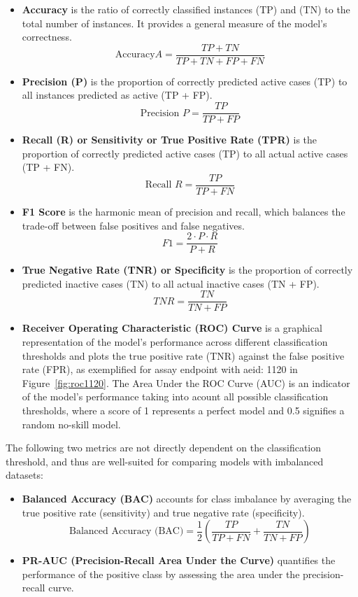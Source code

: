 \begin{itemize}
  \item \textbf{Accuracy} is the ratio of correctly classified instances (TP) and (TN) to the total number of instances. It provides a general measure of the model's correctness.
  \[ \text{Accuracy}  A = \frac{TP + TN}{TP + TN + FP + FN} \]

  \item \textbf{Precision (P)} is the proportion of correctly predicted active cases (TP) to all instances predicted as active (TP + FP). 
  \[ \text{Precision } P = \frac{TP}{TP + FP} \]

  \item \textbf{Recall (R) or Sensitivity or True Positive Rate (TPR)} is the proportion of correctly predicted active cases (TP) to all actual active cases (TP + FN).
  \[ \text{Recall } R = \frac{TP}{TP + FN} \]

  \item \textbf{F1 Score} is the harmonic mean of precision and recall, which balances the trade-off between false positives and false negatives.
  \[ F1 = \frac{2 \cdot P \cdot R}{P + R} \]

  \item \textbf{True Negative Rate (TNR) or Specificity} is the proportion of correctly predicted inactive cases (TN) to all actual inactive cases (TN + FP).
  \[ TNR = \frac{TN}{TN + FP} \]

  \item \textbf{Receiver Operating Characteristic (ROC) Curve} is a graphical representation of the model's performance across different classification thresholds and plots the true positive rate (TNR) against the false positive rate (FPR), as exemplified for assay endpoint with aeid: 1120 in Figure~\ref{fig:roc1120}. The Area Under the ROC Curve (AUC) is an indicator of the model's performance taking into acount all possible classification thresholds, where a score of 1 represents a perfect model and 0.5 signifies a random no-skill model. 


\end{itemize}

The following two metrics are not directly dependent on the classification threshold, and thus are well-suited for comparing models with imbalanced datasets:

\begin{itemize}
  \item \textbf{Balanced Accuracy (BAC)} accounts for class imbalance by averaging the true positive rate (sensitivity) and true negative rate (specificity).
  \[ \text{Balanced Accuracy (BAC)} = \frac{1}{2} \left(\frac{TP}{TP + FN} + \frac{TN}{TN + FP}\right) \]

  \item \textbf{PR-AUC (Precision-Recall Area Under the Curve)} quantifies the performance of the positive class by assessing the area under the precision-recall curve.
  
\end{itemize}


